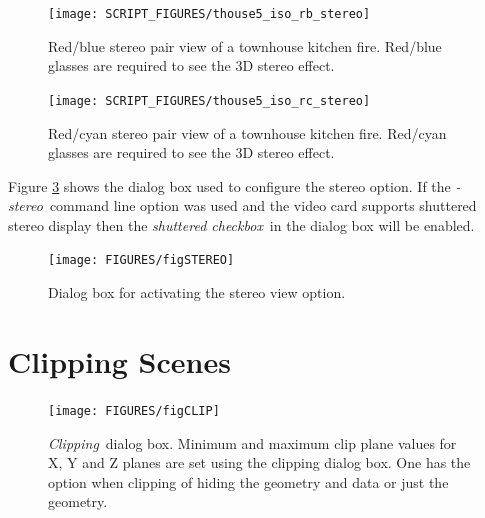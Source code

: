 \documentclass[11pt,twoside]{book}
\begin{document}
\begin{figure}[\figoptions]
\begin{center}
\texttt{[image: SCRIPT\_FIGURES/thouse5\_iso\_rb\_stereo]}\\
\caption[Red/blue stereo pair view of a townhouse kitchen fire.]{
Red/blue stereo pair view of a townhouse kitchen fire. Red/blue
glasses are required to see the 3D stereo effect. }
\label{figrbstereo}
\end{center}
\end{figure}

\begin{figure}[\figoptions]
\begin{center}
\texttt{[image: SCRIPT\_FIGURES/thouse5\_iso\_rc\_stereo]}\\
\caption[Red/cyan stereo pair view of a townhouse kitchen fire.]{
Red/cyan stereo pair view of a townhouse kitchen fire. Red/cyan
glasses are required to see the 3D stereo effect. }
\label{figrcstereo}
\end{center}
\end{figure}

Figure \ref{figstereodialog} shows the dialog box used to
configure the stereo option.  If the {\em -stereo}\ command line
option was used and the video card supports shuttered stereo
display then the {\em shuttered checkbox}\ in the dialog box will
be enabled.

\begin{figure}[\figoptions]
\begin{center}
\texttt{[image: FIGURES/figSTEREO]}
\caption{Dialog box for activating the stereo view option.}
\label{figstereodialog}
\end{center}
\end{figure}
\section{Clipping Scenes}
\label{section:clipping}

\begin{figure}[\figoptions]
\begin{center}
\texttt{[image: FIGURES/figCLIP]}
\end{center}
\caption[{\em Clipping}\ dialog box.]{{\em Clipping}\ dialog box.
Minimum and maximum clip plane values for X, Y and Z planes are
set using the clipping dialog box.  One has the option when
clipping of hiding the geometry and data or just the geometry. }
\label{figCLIP}
\end{figure}
\end{document}
